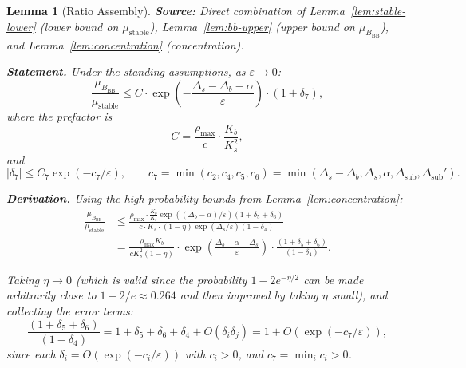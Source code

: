 \documentclass[11pt]{article}
\newtheorem{lemma}{Lemma}
\newcommand{\eps}{\varepsilon}
\newcommand{\Ds}{\Delta_s}
\newcommand{\Db}{\Delta_b}
\newcommand{\BBB}{B_{\mathrm{BB}}}
\begin{document}
\begin{lemma}[Ratio Assembly]\label{lem:ratio}
\textbf{Source:} Direct combination of
Lemma~\ref{lem:stable-lower} (lower bound on $\mu_{\mathrm{stable}}$),
Lemma~\ref{lem:bb-upper} (upper bound on $\mu_\BBB$),
and Lemma~\ref{lem:concentration} (concentration).

\medskip
\textbf{Statement.}
Under the standing assumptions, as $\eps \to 0$:
\begin{equation}\label{eq:ratio}
  \frac{\mu_\BBB}{\mu_{\mathrm{stable}}}
  \leq C \cdot \exp\!\left(
    -\frac{\Ds - \Db - \alpha}{\eps}
  \right)
  \cdot (1 + \delta_7),
\end{equation}
where the prefactor is
\begin{equation}\label{eq:C-prefactor}
  C = \frac{\rho_{\max}}{c} \cdot \frac{K_b}{K_s^2},
\end{equation}
and
\begin{equation}\label{eq:delta7}
  |\delta_7| \leq C_7 \exp(-c_7/\eps),
  \qquad
  c_7 = \min(c_2, c_4, c_5, c_6)
  = \min(\Ds - \Db, \Ds, \alpha, \Delta_{\mathrm{sub}}, \Delta_{\mathrm{sub}}').
\end{equation}

\medskip
\textbf{Derivation.}
Using the high-probability bounds from Lemma~\ref{lem:concentration}:
\begin{align*}
  \frac{\mu_\BBB}{\mu_{\mathrm{stable}}}
  &\leq \frac{\rho_{\max} \cdot \frac{K_b}{K_s}
    \exp((\Db - \alpha)/\eps)(1 + \delta_5 + \delta_6)}
  {c \cdot K_s \cdot (1 - \eta) \exp(\Ds/\eps)(1 - \delta_4)} \\
  &= \frac{\rho_{\max} K_b}{c K_s^2 (1-\eta)}
  \cdot \exp\!\left(\frac{\Db - \alpha - \Ds}{\eps}\right)
  \cdot \frac{(1 + \delta_5 + \delta_6)}{(1 - \delta_4)}.
\end{align*}

Taking $\eta \to 0$ (which is valid since the probability
$1 - 2e^{-\eta/2}$ can be made arbitrarily close to $1 - 2/e
\approx 0.264$ and then improved by taking $\eta$ small),
and collecting the error terms:
\[
  \frac{(1 + \delta_5 + \delta_6)}{(1 - \delta_4)}
  = 1 + \delta_5 + \delta_6 + \delta_4 + O(\delta_i \delta_j)
  = 1 + O(\exp(-c_7/\eps)),
\]
since each $\delta_i = O(\exp(-c_i/\eps))$ with $c_i > 0$, and
$c_7 = \min_i c_i > 0$.


\end{lemma}
\end{document}

